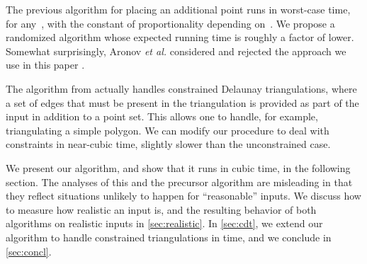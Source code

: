 \documentclass{cccg13}
\begin{document}
The previous algorithm \cite{orig} for placing an additional point runs in worst-case  time, for any~, with the constant of proportionality depending on~.  We propose a randomized algorithm whose expected running time is roughly a factor of  lower.  Somewhat surprisingly, Aronov \emph{et al.} considered and rejected the approach we use in this paper \cite[page~96]{orig}.

The algorithm from \cite{orig} actually handles constrained Delaunay
triangulations, where a set of edges that must be present in the
triangulation is provided as part of the input in addition to a point
set.  This allows one to handle, for example, triangulating a simple
polygon.  We can modify our procedure to deal with constraints in
near-cubic time, slightly slower than the unconstrained case.

We present our algorithm, and show that it runs in cubic time, in the following section.  The analyses of this and the precursor algorithm \cite{orig} are misleading in that they reflect situations unlikely to happen for ``reasonable'' inputs.  We discuss how to measure how realistic an input is, and the resulting behavior of both algorithms on realistic inputs in \autoref{sec:realistic}.  In \autoref{sec:cdt}, we extend our algorithm to handle constrained triangulations in  time, and we conclude in \autoref{sec:concl}.
\end{document}
